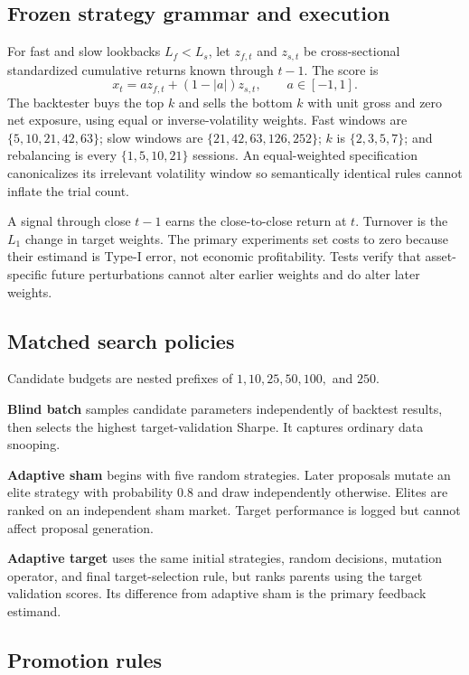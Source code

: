 \documentclass[sigconf,nonacm]{acmart}
\begin{document}
\subsection{Frozen strategy grammar and execution}

For fast and slow lookbacks $L_f<L_s$, let $z_{f,t}$ and $z_{s,t}$ be
cross-sectional standardized cumulative returns known through $t-1$. The score
is
\begin{equation}
 x_t=a z_{f,t}+(1-|a|)z_{s,t},\qquad a\in[-1,1].
\end{equation}
The backtester buys the top $k$ and sells the bottom $k$ with unit gross and zero
net exposure, using equal or inverse-volatility weights. Fast windows are
$\{5,10,21,42,63\}$; slow windows are $\{21,42,63,126,252\}$; $k$ is
$\{2,3,5,7\}$; and rebalancing is every $\{1,5,10,21\}$ sessions. An
equal-weighted specification canonicalizes its irrelevant volatility window so
semantically identical rules cannot inflate the trial count.

A signal through close $t-1$ earns the close-to-close return at $t$. Turnover
is the $L_1$ change in target weights. The primary experiments set costs to zero
because their estimand is Type-I error, not economic profitability. Tests verify
that asset-specific future perturbations cannot alter earlier weights and do
alter later weights.

\subsection{Matched search policies}

Candidate budgets are nested prefixes of $1,10,25,50,100,$ and $250$.

\textbf{Blind batch} samples candidate parameters independently of backtest
results, then selects the highest target-validation Sharpe. It captures ordinary
data snooping.

\textbf{Adaptive sham} begins with five random strategies. Later proposals
mutate an elite strategy with probability 0.8 and draw independently otherwise.
Elites are ranked on an independent sham market. Target performance is logged
but cannot affect proposal generation.

\textbf{Adaptive target} uses the same initial strategies, random decisions,
mutation operator, and final target-selection rule, but ranks parents using the
target validation scores. Its difference from adaptive sham is the primary
feedback estimand.

\subsection{Promotion rules}
\end{document}
